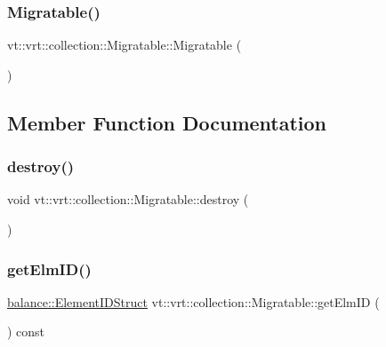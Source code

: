 \subsubsection{\texorpdfstring{Migratable()}{Migratable()}}
{\footnotesize\ttfamily vt\+::vrt\+::collection\+::\+Migratable\+::\+Migratable (\begin{DoxyParamCaption}{ }\end{DoxyParamCaption})}



\subsection{Member Function Documentation}
\mbox{\label{structvt_1_1vrt_1_1collection_1_1_migratable_a31effa8f54013d1a1794cd025c24e410}} 
\subsubsection{\texorpdfstring{destroy()}{destroy()}}
{\footnotesize\ttfamily void vt\+::vrt\+::collection\+::\+Migratable\+::destroy (\begin{DoxyParamCaption}{ }\end{DoxyParamCaption})\hspace{0.3cm}{\ttfamily [virtual]}}

\mbox{\label{structvt_1_1vrt_1_1collection_1_1_migratable_a1b074bbe076e5eb0f83141e4b4504afe}} 
\subsubsection{\texorpdfstring{get\+Elm\+I\+D()}{getElmID()}}
{\footnotesize\ttfamily \hyperlink{structvt_1_1vrt_1_1collection_1_1balance_1_1_element_i_d_struct}{balance\+::\+Element\+I\+D\+Struct} vt\+::vrt\+::collection\+::\+Migratable\+::get\+Elm\+ID (\begin{DoxyParamCaption}{ }\end{DoxyParamCaption}) const\hspace{0.3cm}{\ttfamily [inline]}}

